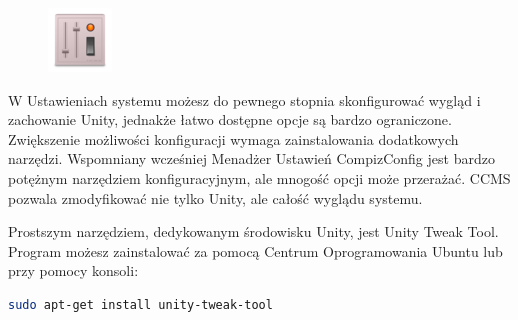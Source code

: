 \begin{figure}
	\vspace{-10pt}
	\includegraphics[width=\linewidth]{images/ikony_unitytweaktool.png}
\end{figure}

W \textcolor{ubuntu_orange}{Ustawieniach systemu} możesz do pewnego stopnia skonfigurować wygląd i zachowanie Unity, jednakże łatwo dostępne opcje są bardzo ograniczone. Zwiększenie możliwości konfiguracji wymaga zainstalowania dodatkowych narzędzi. Wspomniany wcześniej Menadżer Ustawień CompizConfig jest bardzo potężnym narzędziem konfiguracyjnym, ale mnogość opcji może przerażać. CCMS pozwala zmodyfikować nie tylko Unity, ale całość wyglądu systemu.

Prostszym narzędziem, dedykowanym środowisku Unity, jest \textcolor{ubuntu_orange}{Unity Tweak Tool}. Program możesz zainstalować za pomocą Centrum Oprogramowania Ubuntu lub przy pomocy konsoli:
\begin{lstlisting}[language=bash]
sudo apt-get install unity-tweak-tool
\end{lstlisting}
